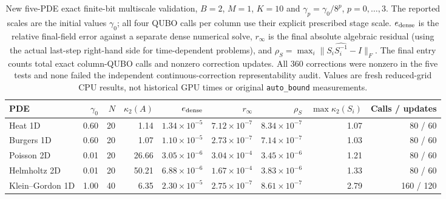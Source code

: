 \begin{table}[t]
\centering\scriptsize
\caption{New five-PDE exact finite-bit multiscale validation, $B=2$, $M=1$,
$K=10$ and $\gamma_p=\gamma_0/8^p$, $p=0,\ldots,3$. The reported scales
are the initial values $\gamma_0$; all four QUBO calls per column use their
explicit prescribed stage scale. $e_{\rm dense}$ is the relative final-field
error against a separate dense numerical solve, $r_\infty$ is the final
absolute algebraic residual (using the actual last-step right-hand side for
time-dependent problems), and $\rho_S=\max_i\|S_i\widehat{S_i^{-1}}-I\|_F$.
The final entry counts total exact column-QUBO calls and nonzero correction
updates. All 360 corrections were nonzero in the five tests and none failed
the independent continuous-correction representability audit. Values are
fresh reduced-grid CPU results, not historical GPU times or original
\texttt{auto\_bound} measurements.}
\label{tab:fixed_validation}
\begin{tabular}{lrrrrrrrr}
\toprule
PDE & $\gamma_0$ & $N$ & $\kappa_2(A)$ & $e_{\rm dense}$ & $r_\infty$ & $\rho_S$ & $\max\kappa_2(S_i)$ & Calls / updates \\
\midrule
Heat 1D & 0.60 & 20 & 1.14 & $1.34\times10^{-5}$ & $7.12\times10^{-7}$ & $8.34\times10^{-7}$ & 1.07 & 80 / 60 \\
Burgers 1D & 0.60 & 20 & 1.07 & $1.10\times10^{-5}$ & $2.73\times10^{-7}$ & $7.14\times10^{-7}$ & 1.03 & 80 / 60 \\
Poisson 2D & 0.01 & 20 & 26.66 & $3.05\times10^{-6}$ & $3.04\times10^{-4}$ & $3.45\times10^{-6}$ & 1.21 & 80 / 60 \\
Helmholtz 2D & 0.01 & 20 & 50.21 & $6.88\times10^{-6}$ & $1.67\times10^{-4}$ & $3.83\times10^{-6}$ & 1.33 & 80 / 60 \\
Klein--Gordon 1D & 1.00 & 40 & 6.35 & $2.30\times10^{-5}$ & $2.75\times10^{-7}$ & $8.61\times10^{-7}$ & 2.79 & 160 / 120 \\
\bottomrule
\end{tabular}
\end{table}

